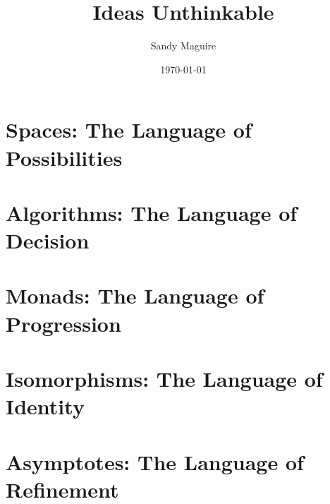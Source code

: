 \documentclass[12pt]{book}
\title{Ideas Unthinkable}
\author{Sandy Maguire}
\date{\today}
\begin{document}
 \maketitle



\chapter{Spaces: The Language of Possibilities}



\chapter{Algorithms: The Language of Decision}
\chapter{Monads: The Language of Progression}
\chapter{Isomorphisms: The Language of Identity}
\chapter{Asymptotes: The Language of Refinement}
\end{document}
